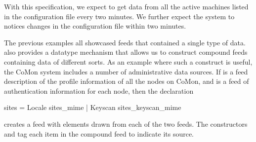 With this specification, we
expect to get data from all the active machines listed in the
configuration file every two minutes.  We further expect the system to
notices changes in the configuration file within two minutes.

The previous examples all showcased feeds that contained a single type
of data.  \padsd{} also provides a datatype mechanism that allows us
to construct compound feeds containing data of different sorts.  
As an example where such a construct is useful, the CoMon system includes a
number of administrative data sources.  
If  is a feed description of the profile
information of all the nodes on CoMon, and  is 
a feed of authentication information for each node, then the declaration
%
\begin{code}
 sites = 
    Locale  sites_mime
  | Keyscan  sites_keyscan_mime
\end{code}
%
creates a feed with elements drawn from each of the two 
feeds.  The constructors  and  tag each item in
the compound feed to indicate its source. 


